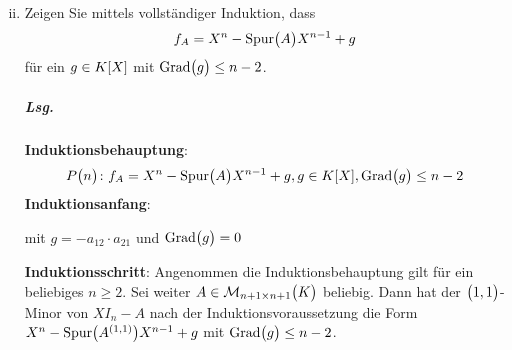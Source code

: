 \documentclass{scrreprt}
\newcommand{\Grad}{\text{Grad}}
\newcommand{\Spur}{\text{Spur}}
\begin{document}
\begin{landscape}
\begin{enumerate}[(i)]
\setcounter{enumi}{1}
\item Zeigen Sie mittels vollständiger Induktion, dass
  \[
    f_A = X^n - \Spur\qty\big(A)X^{n - 1} + g
  \]
  für ein $g \in K\qty[X]$ mit $\Grad\qty\big(g) \leq n - 2$.

  \subparagraph{Lsg.} \textbf{Induktionsbehauptung}:
  \[
    P\qty\big(n) \colon f_A = X^n - \Spur\qty\big(A)X^{n - 1} + g,
    g \in K\qty[X], \Grad\qty\big(g) \leq n - 2
  \]
  \textbf{Induktionsanfang}:
  mit $g = - a_{12} \cdot a_{21}$ und $\Grad\qty\big(g) = 0$

  \textbf{Induktionsschritt}: Angenommen die Induktionsbehauptung gilt für ein
  beliebiges $n \geq 2$.
  Sei weiter $A \in \mathcal{M}_{n + 1 \times n + 1}\qty\big(K)$ beliebig.
  Dann hat der $\qty\big(1, 1)$-Minor
  von $XI_n - A$ nach der Induktionsvoraussetzung die Form
  $X^n - \Spur\qty\big(A^{\qty(1, 1)})X^{n - 1} + g$ mit
  $\Grad\qty\big(g) \leq n - 2$.


\end{enumerate}
\end{landscape}
\end{document}
